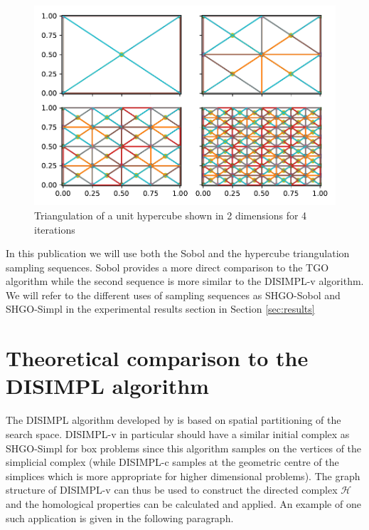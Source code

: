 \begin{figure}
\centerline{\includegraphics[scale=0.8]{./Fig10.pdf}}
{\caption{Triangulation of a unit hypercube shown in 2 dimensions for 4 iterations  \label{fig:triangles} }}
\end{figure}

In this publication we will use both the Sobol and the hypercube triangulation sampling sequences. Sobol provides a more direct comparison to the TGO algorithm while the second sequence is more similar to the DISIMPL-v algorithm. We will refer to the different uses of sampling sequences as SHGO-Sobol and SHGO-Simpl in the experimental results section in Section \ref{sec:results}

\section{Theoretical comparison to the DISIMPL algorithm}
The DISIMPL algorithm developed by \citeauthor{Paul2014b} \cite{Paul2014b, paulavivcius2014simplicial, Paul2014a} is based on spatial partitioning of the search space. DISIMPL-v in particular should have a similar initial complex as SHGO-Simpl for box problems since this algorithm samples on the vertices of the simplicial complex (while DISIMPL-c samples at the geometric centre of the simplices which is more appropriate for higher dimensional problems). The graph structure of DISIMPL-v can thus be used to construct the directed complex $\mathcal{H}$ and the homological properties can be calculated and applied. An example of one such application is given in the following paragraph.

